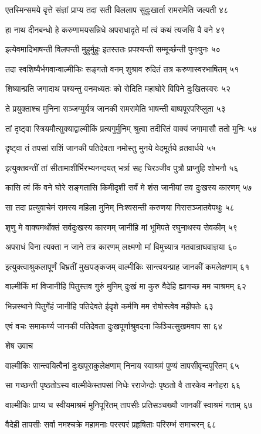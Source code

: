 एतस्मिन्समये वृत्ते संज्ञां प्राप्य तदा सती
विललाप सुदुःखार्ता रामरामेति जल्पती ४८

हा नाथ दीनबन्धो हे करुणामयसन्निधे
अपराधादृते मां त्वं कथं त्यजसि वै वने ४९

इत्येवमादिभाषन्ती विलपन्ती मुहुर्मुहुः
इतस्ततः प्रपश्यन्ती सम्मूर्च्छन्ती पुनःपुनः ५०

तदा स्वशिष्यैर्भगवान्वाल्मीकिः सङ्गतो वनम्
शुश्राव रुदितं तत्र करुणास्वरभाषितम् ५१

शिष्यान्प्रति जगादाथ पश्यन्तु वनमध्यतः
को रोदिति महाघोरे विपिने दुःखितस्वरः ५२

ते प्रयुक्ताश्च मुनिना सञ्जग्मुर्यत्र जानकी
रामरामेति भाषन्ती बाष्पपूरपरिप्लुता ५३

तां दृष्ट्वा स्त्रियमौत्सुक्याद्वाल्मीकिं प्रत्यगुर्मुनिम्
श्रुत्वा तदीरितं वाक्यं जगामासौ ततो मुनिः ५४

दृष्ट्वा तं तपसां राशिं जानकी पतिदेवता
नमोस्तु मुनये वेदमूर्तये व्रतवार्धये ५५

इत्युक्तवन्तीं तां सीतामाशीर्भिरभ्यनन्दयत्
भर्त्रा सह चिरञ्जीव पुत्रौ प्राप्नुहि शोभनौ ५६

कासि त्वं किं वने घोरे सङ्गतासि किमीदृशी
सर्वं मे शंस जानीयां तव दुःखस्य कारणम् ५७

सा तदा प्रत्युवाचेमं रामस्य महिला मुनिम्
निःश्वसन्ती करुणया गिरासञ्जातवेपथुः ५८

शृणु मे वाक्यमर्थोक्तं सर्वदुःखस्य कारणम्
जानीहि मां भूमिपते रघुनाथस्य सेवकीम् ५९

अपराधं विना त्यक्ता न जाने तत्र कारणम्
लक्ष्मणो मां विमुच्यात्र गतवान्राघवाज्ञया ६०

इत्युक्त्वाश्रुकलापूर्णं बिभ्रतीं मुखपङ्कजम्
वाल्मीकिः सान्त्वयन्प्राह जानकीं कमलेक्षणाम् ६१

वाल्मीकिं मां विजानीहि पितुस्तव गुरुं मुनिम्
दुःखं मा कुरु वैदेहि ह्यागच्छ मम चाश्रमम् ६२

भिन्नस्थाने पितुर्गेहं जानीहि पतिदेवते
ईदृशे कर्मणि मम रोषोस्त्वेव महीपतेः ६३

एवं वचः समाकर्ण्य जानकी पतिदेवता
दुःखपूर्णाश्रुवदना किञ्चित्सुखमवाप सा ६४

शेष उवाच

वाल्मीकिः सान्त्वयित्वैनां दुःखपूराकुलेक्षणाम्
निनाय स्वाश्रमं पुण्यं तापसीवृन्दपूरितम् ६५

सा गच्छन्ती पृष्ठतोऽस्य वाल्मीकेस्तपसां निधेः
रराजेन्दोः पृष्ठतो वै तारकेव मनोहरा ६६

वाल्मीकिः प्राप्य च स्वीयमाश्रमं मुनिपूरितम्
तापसीः प्रतिसञ्चख्यौ जानकीं स्वाश्रमं गताम् ६७

वैदेही तापसीः सर्वा नमश्चक्रे महामनाः
परस्परं प्रहृषिताः परिरम्भं समाचरन् ६८

